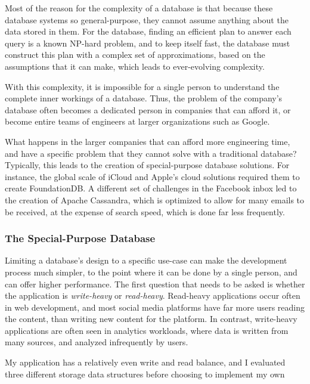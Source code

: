 \documentclass[10pt,twocolumn]{article}
\begin{document}
Most of the reason for the complexity of a database is that because these
database systems so general-purpose, they cannot assume anything about the data
stored in them. For the database, finding an efficient plan to answer each query
is a known NP-hard problem\cite{chatterji2002complexity}, and to keep itself
fast, the database must construct this plan with a complex set of
approximations, based on the assumptions that it can make, which leads to
ever-evolving complexity.

With this complexity, it is impossible for a single person to understand the
complete inner workings of a database. Thus, the problem of the company's
database often becomes a dedicated person in companies that can afford it, or
become entire teams of engineers at larger organizations such as
Google\cite{googlePerfTeam}.

What happens in the larger companies that can afford more engineering time, and
have a specific problem that they cannot solve with a traditional database?
Typically, this leads to the creation of special-purpose database solutions. For
instance, the global scale of iCloud and Apple's cloud solutions required them
to create FoundationDB\cite{zhou2021foundationdb}. A different set of challenges
in the Facebook inbox led to the creation of Apache
Cassandra\cite{lakshman2010cassandra}, which is optimized to allow for many
emails to be received, at the expense of search speed, which is done far less
frequently.

\subsubsection{The Special-Purpose Database}

Limiting a database's design to a specific use-case can make the development
process much simpler, to the point where it can be done by a single person, and
can offer higher performance. The first question that needs to be asked is
whether the application is \textit{write-heavy} or \textit{read-heavy}.
Read-heavy applications occur often in web development, and most social media
platforms have far more users reading the content, than writing new content for
the platform. In contrast, write-heavy applications are often seen in analytics
workloads, where data is written from many sources, and analyzed infrequently by
users.

My application has a relatively even write and read balance, and I evaluated
three different storage data structures before choosing to implement my own
\end{document}
